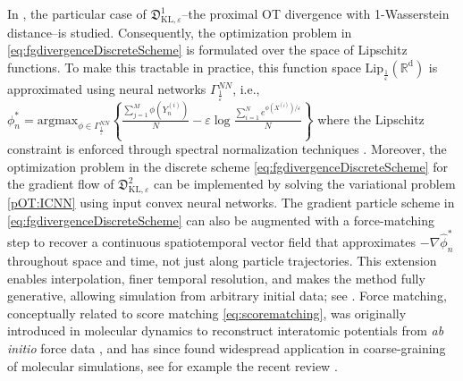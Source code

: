 \documentclass{amsart}
\theoremstyle{definition}
\theoremstyle{remark}
\numberwithin{equation}{section}
\begin{document}

 In \cite{Gu_GPA}, the particular case of $\mathfrak{D}_{\mathrm{KL},\varepsilon}^{1}$--the proximal OT divergence with 1-Wasserstein distance--is studied. Consequently, the optimization problem in \eqref{eq:fgdivergenceDiscreteScheme} is formulated over the space of Lipschitz functions. To make this tractable in practice, this function space $\mathrm{Lip_{\frac{1}{\varepsilon}}({\mathbb{R}}^d)}$ is approximated using neural networks $\Gamma^{NN}_{\frac{1}{\varepsilon}}$,  i.e., $\phi_n^*=\textrm{argmax}_{\phi\in \Gamma^{NN}_{\frac{1}{\varepsilon}}}\left\{\frac{\sum_{j=1}^M\phi(Y_n^{(i)})}{N} - \varepsilon \log \frac{\sum_{i=1}^N e^{\phi(X^{(i)})/\varepsilon}}{N}\right\}$
 where the Lipschitz constraint is enforced through spectral normalization techniques \cite{Miyato_spectral_norm}. Moreover, the optimization problem in the discrete scheme \eqref{eq:fgdivergenceDiscreteScheme} for the gradient flow of $\mathfrak{D}_{\mathrm{KL},\varepsilon}^2$ can be  implemented by solving the variational problem \eqref{pOT:ICNN} using input convex neural networks. {\color{black} The gradient particle scheme in \eqref{eq:fgdivergenceDiscreteScheme} can also be augmented with a force-matching step to recover a continuous spatiotemporal vector field that approximates \(-\nabla \widehat{\phi}_n^*\) throughout space and time, not just along particle trajectories. This extension enables interpolation, finer temporal resolution, and makes the method fully generative, allowing simulation from arbitrary initial data; see \cite{Cheng2025PROFET}. Force matching, conceptually related to score matching \eqref{eq:scorematching}, was originally introduced in molecular dynamics to reconstruct interatomic potentials from \emph{ab initio} force data \cite{ErcolessiAdams1994}, and has since found widespread application in coarse-graining of molecular simulations, see for example the recent review \cite{Noid2024}.}
\end{document}
